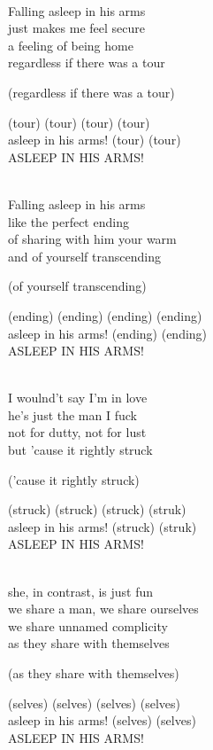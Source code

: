 \begin{lyrics}

\\
Falling asleep in his arms\\
just makes me feel secure\\
a feeling of being home\\
regardless if there was a tour

(regardless if there was a tour)

(tour) (tour) (tour) (tour)\\
asleep in his arms! (tour) (tour)\\
ASLEEP IN HIS ARMS!

\\
Falling asleep in his arms\\
like the perfect ending\\
of sharing with him your warm\\
and of yourself transcending

(of yourself transcending)

(ending) (ending) (ending) (ending)\\
asleep in his arms! (ending) (ending)\\
ASLEEP IN HIS ARMS!

\\
I woulnd't say I'm in love\\
he's just the man I fuck\\
not for dutty, not for lust\\
but 'cause it rightly struck

('cause it rightly struck)

(struck) (struck) (struck) (struk)\\
asleep in his arms! (struck) (struk)\\
ASLEEP IN HIS ARMS!

\\
she, in contrast, is just fun\\
we share a man, we share ourselves\\
we share unnamed complicity\\
as they share with themselves

(as they share with themselves)

(selves) (selves) (selves) (selves)\\
asleep in his arms! (selves) (selves)\\
ASLEEP IN HIS ARMS!


\end{lyrics}
